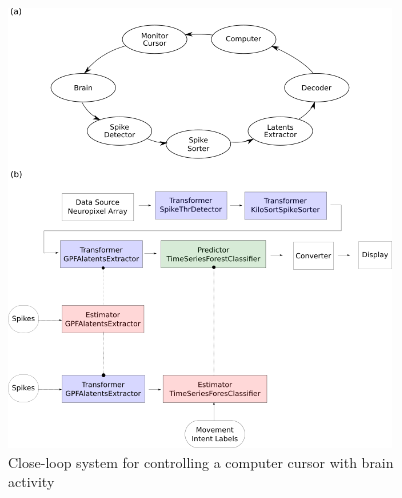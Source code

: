 \begin{figure}
   \begin{center}
       \includegraphics[width=4in]{figures/bci.png}
       \caption{Close-loop system for controlling a computer cursor with brain activity}
     \label{fig:bci}
   \end{center}
\end{figure}

